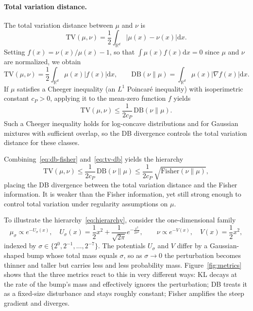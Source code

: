 \documentclass{article}
\newcommand{\Le}{\leqslant}
\newcommand{\D}{\mathrm{d}}
\newcommand{\DB}{\mathrm{DB}}
\newcommand{\TV}{\mathrm{TV}}
\newcommand{\Fish}{\mathrm{Fisher}}
\theoremstyle{plain}
\begin{document}
\paragraph{Total variation distance.}
The total variation distance between $\mu$ and $\nu$ is
\begin{equation*}
    \TV(\mu, \nu) = \frac{1}{2} \int_{\mathbb R^d} |\mu(x) - \nu(x)| \D x.
\end{equation*}
Setting $f(x) = \nu(x)/\mu(x) - 1$, so that $\int \mu(x) f(x) \D x = 0$ since $\mu$ and $\nu$ are normalized, we obtain
\begin{equation*}
    \TV(\mu, \nu) = \frac{1}{2} \int_{\mathbb R^d} \mu(x) |f(x)| \D x, \qquad \DB(\nu \| \mu) = \int_{\mathbb R^d} \mu(x) |\nabla f(x)| \D x.
\end{equation*}
If $\mu$ satisfies a Cheeger inequality (an $L^1$ Poincar\'{e} inequality) with isoperimetric constant $c_{P} > 0$, applying it to the mean-zero function $f$ yields
\begin{equation}\label{eq:tv-db}
    \TV(\mu, \nu) \Le \frac{1}{2c_{P}}\, \DB(\nu \| \mu).
\end{equation}
Such a Cheeger inequality holds for log-concave distributions and for Gaussian mixtures with sufficient overlap, so the DB divergence controls the total variation distance for these classes.

Combining~\eqref{eq:db-fisher} and~\eqref{eq:tv-db} yields the hierarchy
\begin{equation}\label{eq:hierarchy}
    \TV(\mu, \nu) \Le \frac{1}{2c_{P}}\, \DB(\nu \| \mu) \Le \frac{1}{2c_{P}}\, \sqrt{\Fish(\nu \| \mu)},
\end{equation}
placing the DB divergence between the total variation distance and the Fisher information. It is weaker than the Fisher information, yet still strong enough to control total variation under regularity assumptions on $\mu$.

To illustrate the hierarchy~\eqref{eq:hierarchy}, consider the one-dimensional family
\begin{equation*}
    \mu_\sigma \propto e^{-U_\sigma(x)}, \quad U_\sigma(x) = \frac{1}{2}x^2 + \frac{1}{\sqrt{2\pi}} e^{-\frac{x^2}{2\sigma^2}}, \qquad \nu \propto e^{-V(x)}, \quad V(x) = \frac{1}{2}x^2,
\end{equation*}
indexed by $\sigma \in \{2^0, 2^{-1}, \dots, 2^{-7}\}$. The potentials $U_\sigma$ and $V$ differ by a Gaussian-shaped bump whose total mass equals $\sigma$, so as $\sigma \to 0$ the perturbation becomes thinner and taller but carries less and less probability mass. Figure~\ref{fig:metrics} shows that the three metrics react to this in very different ways: KL decays at the rate of the bump's mass and effectively ignores the perturbation; DB treats it as a fixed-size disturbance and stays roughly constant; Fisher amplifies the steep gradient and diverges.
\end{document}
